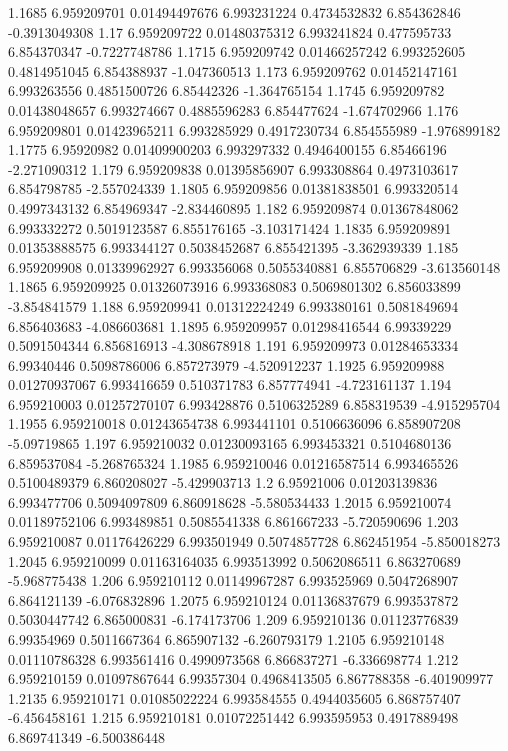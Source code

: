 {1.1685 6.959209701 0.01494497676 6.993231224 0.4734532832 6.854362846 -0.3913049308
1.17 6.959209722 0.01480375312 6.993241824 0.477595733 6.854370347 -0.7227748786
1.1715 6.959209742 0.01466257242 6.993252605 0.4814951045 6.854388937 -1.047360513
1.173 6.959209762 0.01452147161 6.993263556 0.4851500726 6.85442326 -1.364765154
1.1745 6.959209782 0.01438048657 6.993274667 0.4885596283 6.854477624 -1.674702966
1.176 6.959209801 0.01423965211 6.993285929 0.4917230734 6.854555989 -1.976899182
1.1775 6.95920982 0.01409900203 6.993297332 0.4946400155 6.85466196 -2.271090312
1.179 6.959209838 0.01395856907 6.993308864 0.4973103617 6.854798785 -2.557024339
1.1805 6.959209856 0.01381838501 6.993320514 0.4997343132 6.854969347 -2.834460895
1.182 6.959209874 0.01367848062 6.993332272 0.5019123587 6.855176165 -3.103171424
1.1835 6.959209891 0.01353888575 6.993344127 0.5038452687 6.855421395 -3.362939339
1.185 6.959209908 0.01339962927 6.993356068 0.5055340881 6.855706829 -3.613560148
1.1865 6.959209925 0.01326073916 6.993368083 0.5069801302 6.856033899 -3.854841579
1.188 6.959209941 0.01312224249 6.993380161 0.5081849694 6.856403683 -4.086603681
1.1895 6.959209957 0.01298416544 6.99339229 0.5091504344 6.856816913 -4.308678918
1.191 6.959209973 0.01284653334 6.99340446 0.5098786006 6.857273979 -4.520912237
1.1925 6.959209988 0.01270937067 6.993416659 0.510371783 6.857774941 -4.723161137
1.194 6.959210003 0.01257270107 6.993428876 0.5106325289 6.858319539 -4.915295704
1.1955 6.959210018 0.01243654738 6.993441101 0.5106636096 6.858907208 -5.09719865
1.197 6.959210032 0.01230093165 6.993453321 0.5104680136 6.859537084 -5.268765324
1.1985 6.959210046 0.01216587514 6.993465526 0.5100489379 6.860208027 -5.429903713
1.2 6.95921006 0.01203139836 6.993477706 0.5094097809 6.860918628 -5.580534433
1.2015 6.959210074 0.01189752106 6.993489851 0.5085541338 6.861667233 -5.720590696
1.203 6.959210087 0.01176426229 6.993501949 0.5074857728 6.862451954 -5.850018273
1.2045 6.959210099 0.01163164035 6.993513992 0.5062086511 6.863270689 -5.968775438
1.206 6.959210112 0.01149967287 6.993525969 0.5047268907 6.864121139 -6.076832896
1.2075 6.959210124 0.01136837679 6.993537872 0.5030447742 6.865000831 -6.174173706
1.209 6.959210136 0.01123776839 6.99354969 0.5011667364 6.865907132 -6.260793179
1.2105 6.959210148 0.01110786328 6.993561416 0.4990973568 6.866837271 -6.336698774
1.212 6.959210159 0.01097867644 6.99357304 0.4968413505 6.867788358 -6.401909977
1.2135 6.959210171 0.01085022224 6.993584555 0.4944035605 6.868757407 -6.456458161
1.215 6.959210181 0.01072251442 6.993595953 0.4917889498 6.869741349 -6.500386448
}
